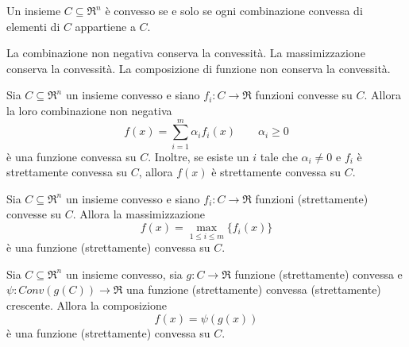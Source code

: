 \begin{theorem}
	\label{thm:convexity-set-condition}
	Un insieme $C\subseteq\Re^{n}$ è convesso se e solo se ogni combinazione convessa di elementi di $C$ appartiene a $C$.
\end{theorem}

La combinazione non negativa conserva la convessità. La massimizzazione conserva la convessità. La composizione di funzione non conserva la convessità.

\begin{theorem}
	\label{thm:nonnegative-combination-convex-functions}
	Sia $C\subseteq\Re^{n}$ un insieme convesso e siano $f_{i}:C\rightarrow\Re$ funzioni convesse su $C$. Allora la loro combinazione non negativa
	\begin{equation}
	\label{eqn:nonegative-combination-convex-functions}
		f(x)=\sum_{i=1}^{m}\alpha_{i}f_{i}(x)\qquad\alpha_{i}\geq 0
	\end{equation}
	è una funzione convessa su $C$.
	Inoltre, se esiste un $i$ tale che $\alpha_{i}\neq 0$ e $f_{i}$ è strettamente convessa su $C$, allora $f(x)$ è strettamente convessa su $C$.
\end{theorem}

\begin{theorem}
	\label{thm:maximum-convex-functions}
	Sia $C\subseteq\Re^{n}$ un insieme convesso e siano $f_{i}:C\rightarrow\Re$ funzioni (strettamente) convesse su $C$. Allora la massimizzazione
	\begin{equation}
	\label{eqn:maximum-convex-functions}
		f(x)=\max_{1\leq i\leq m}\{f_{i}(x)\}
	\end{equation}
	è una funzione (strettamente) convessa su $C$.
\end{theorem}

\begin{theorem}
	\label{thm:composition-convex-functions}
	Sia $C\subseteq\Re^{n}$ un insieme convesso, sia $g:C\rightarrow\Re$ funzione (strettamente) convessa e $\psi:Conv(g(C))\rightarrow\Re$ una funzione (strettamente) convessa (strettamente) crescente. Allora la composizione
	\begin{equation}
	\label{eqn:composition-convex-functions}
	f(x)=\psi(g(x))
	\end{equation}
	è una funzione (strettamente) convessa su $C$.
\end{theorem}
